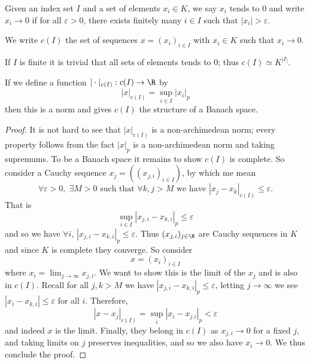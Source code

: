 \begin{definition}
    Given an index set $I$ and a set of elements $x_i \in K$, we say $x_i$ tends to $0$ and write
    $x_i \to 0$ if for all $\varepsilon > 0$, there exists finitely many $i \in I$ such that
    $|x_i| > \varepsilon.$

    We write $c(I)$ the set of sequences $x = (x_i)_{i \in I}$ with $x_i \in K$ such that
    $x_i \to 0$.
\end{definition}

\begin{remark}
    If $I$ is finite it is trivial that all sets of elements tends to $0$; thus
    $c(I) \simeq K^{|I|}$.
\end{remark}

\begin{lemma}\label{Norm}
    If we define a function $|\cdot|_{c(I)} : c(I) \to \R$ by
    \[
    |x|_{c(I)} = \sup_{i \in I} |x_i|_p
    \]
    then this is a norm and gives $c(I)$ the structure of a Banach space.
\end{lemma}

\begin{proof}
    It is not hard to see that $|x|_{c(I)}$ is a non-archimedean norm; every property follows from the fact $|x|_p$ is a non-archimedean norm and taking supremums.
    To be a Banach space it remains to show $c(I)$ is complete. So consider a Cauchy sequence $x_j = ((x_{j,i})_{i \in I})$, by which me mean
    \[
    \forall \varepsilon > 0, \; \exists M > 0 \text{ such that } \forall k,j > M \text{ we have }
    |x_j - x_k |_{c(I)} \leq \varepsilon.
    \]
    That is
    \[
    \sup_{i \in I} |x_{j,i} - x_{k,i} |_p \leq \varepsilon
    \]
    and so we have $\forall i$, $|x_{j,i} - x_{k,i} |_p \leq \varepsilon$. Thus $(x_{j,i})_{j \in \N}$ are Cauchy sequences in $K$ and since $K$ is complete they converge.
    So consider
    \[
    x = (x_i)_{i \in I}
    \]
    where $x_i = \lim_{j \to \infty} x_{j,i}$. We want to show this is the limit of the $x_j$ and is also in $c(I)$.
    Recall for all $j,k > M$ we have $|x_{j,i} - x_{k,i}|_p \leq \varepsilon$, letting $j \to \infty$ we see $|x_i - x_{k,i} | \leq \varepsilon$ for all $i$. Therefore,
    \[
    |x - x_j |_{c(I)} = \sup_i |x_i - x_{j.i}|_p < \varepsilon
    \]
    and indeed $x$ is the limit. Finally, they belong in $c(I)$ as $x_{j,i} \to 0$ for a fixed $j$, and taking limits on $j$ preserves inequalities, and so we also have $x_i \to 0$. We thus conclude the proof.
\end{proof}

